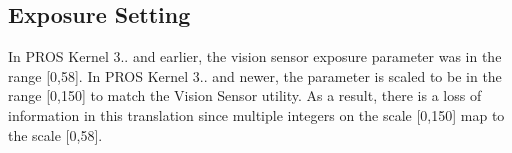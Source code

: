 \subsection*{Exposure Setting}

In P\+R\+OS Kernel 3.. and earlier, the vision sensor exposure parameter was in the range \mbox{[}0,58\mbox{]}. In P\+R\+OS Kernel 3.. and newer, the parameter is scaled to be in the range \mbox{[}0,150\mbox{]} to match the Vision Sensor utility. As a result, there is a loss of information in this translation since multiple integers on the scale \mbox{[}0,150\mbox{]} map to the scale \mbox{[}0,58\mbox{]}. 